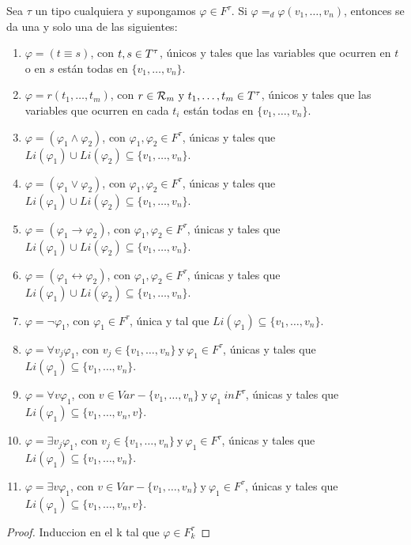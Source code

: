   \begin{lemma} \label{lemma_61}
    \PN Sea $\tau$ un tipo cualquiera y supongamos $\varphi \in F^{\tau}$. Si $\varphi =_{d} \varphi(v_{1}, \dotsc,
    v_{n})$, entonces se da una y solo una de las siguientes:
    \begin{enumerate}[(1)]
      \item $\varphi = (t \equiv s)$, con $t, s \in T^{\tau}$, únicos y tales que las variables que ocurren en $t$ o en $s$
      están todas en $ \{v_{1}, \dotsc, v_{n}\}$.
      \item $\varphi = r(t_{1}, \dotsc, t_{m})$, con $r \in \mathcal{R}_{m} \ \text{y} \ t_{1}, \dotsc, t_{m} \in T^{\tau}$, únicos y
      tales que las variables que ocurren en cada $t_{i}$ están todas en $\{v_{1}, \dotsc, v_{n}\}$.
      \item $\varphi = (\varphi_{1} \wedge \varphi_{2})$, con $\varphi_{1}, \varphi_{2} \in F^{\tau}$, únicas y tales
      que $Li(\varphi_{1}) \cup Li(\varphi_{2}) \subseteq \{v_{1}, \dotsc, v_{n}\}$.
      \item $\varphi = (\varphi_{1} \vee \varphi_{2})$, con $\varphi_{1}, \varphi_{2} \in F^{\tau}$, únicas y tales que
      $Li(\varphi_{1}) \cup Li(\varphi_{2}) \subseteq \{v_{1}, \dotsc, v_{n}\}$.
      \item $\varphi = (\varphi_{1} \rightarrow \varphi_{2})$, con $\varphi_{1}, \varphi_{2} \in F^{\tau}$, únicas y
      tales que $Li(\varphi_{1}) \cup Li(\varphi_{2}) \subseteq \{v_{1}, \dotsc, v_{n}\}$.
      \item $\varphi = (\varphi_{1} \leftrightarrow \varphi_{2})$, con $ \varphi_{1}, \varphi_{2} \in F^{\tau}$, únicas
      y tales que $Li(\varphi_{1}) \cup Li(\varphi_{2}) \subseteq \{v_{1}, \dotsc, v_{n}\}$.
      \item $\varphi = \lnot \varphi_{1}$, con $\varphi_{1} \in F^{\tau}$, única y tal que $Li(\varphi_{1}) \subseteq
      \{v_{1}, \dotsc, v_{n}\}$.
      \item $\varphi = \forall v_{j} \varphi_{1}$, con $v_{j} \in \{v_{1}, \dotsc, v_{n}\} \ \text{y} \ \varphi_{1} \in
      F^{\tau}$, únicas y tales que $ Li(\varphi_{1}) \subseteq \{v_{1}, \dotsc, v_{n}\}$.
      \item $\varphi = \forall v \varphi_{1}$, con $v \in Var-\{v_{1}, \dotsc, v_{n}\} \ \text{y} \ \varphi_{1}\ in F^{\tau}$,
      únicas y tales que $ Li(\varphi_{1}) \subseteq \{v_{1}, \dotsc, v_{n}, v\}$.
      \item $\varphi = \exists v_{j} \varphi_{1}$, con $v_{j} \in \{v_{1}, \dotsc, v_{n}\} \ \text{y} \ \varphi_{1} \in
      F^{\tau}$, únicas y tales que $ Li(\varphi_{1}) \subseteq \{v_{1}, \dotsc, v_{n}\}$.
      \item $\varphi = \exists v \varphi_{1}$, con $v \in Var-\{v_{1}, \dotsc, v_{n}\} \ \text{y} \ \varphi_{1} \in F^{\tau}$,
      únicas y tales que $ Li(\varphi_{1}) \subseteq \{v_{1}, \dotsc, v_{n}, v\}$.
    \end{enumerate}
  \end{lemma}
  \begin{proof}
    Induccion en el k tal que $\varphi \in F_{k}^{\tau}$
  \end{proof}

